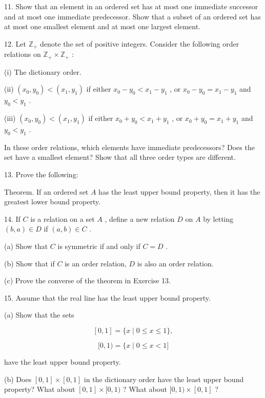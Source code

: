 11. Show that an element in an ordered set has at most one immediate successor and at most one immediate predecessor. Show that a subset of an ordered set has at most one smallest element and at most one largest element.

12. Let \({\mathbb{Z}}_{ + }\) denote the set of positive integers. Consider the following order relations on \({\mathbb{Z}}_{ + } \times  {\mathbb{Z}}_{ + }\) :

(i) The dictionary order.

(ii) \(\left( {{x}_{0},{y}_{0}}\right)  < \left( {{x}_{1},{y}_{1}}\right)\) if either \({x}_{0} - {y}_{0} < {x}_{1} - {y}_{1}\) , or \({x}_{0} - {y}_{0} = {x}_{1} - {y}_{1}\) and \({y}_{0} < {y}_{1}\) .

(iii) \(\left( {{x}_{0},{y}_{0}}\right)  < \left( {{x}_{1},{y}_{1}}\right)\) if either \({x}_{0} + {y}_{0} < {x}_{1} + {y}_{1}\) , or \({x}_{0} + {y}_{0} = {x}_{1} + {y}_{1}\) and \({y}_{0} < {y}_{1}\) .

In these order relations, which elements have immediate predecessors? Does the set have a smallest element? Show that all three order types are different.

13. Prove the following:

Theorem. If an ordered set \(A\) has the least upper bound property, then it has the greatest lower bound property.

14. If \(C\) is a relation on a set \(A\) , define a new relation \(D\) on \(A\) by letting \(\left( {b,a}\right)  \in  D\) if \(\left( {a,b}\right)  \in  C\) .

(a) Show that \(C\) is symmetric if and only if \(C = D\) .

(b) Show that if \(C\) is an order relation, \(D\) is also an order relation.

(c) Prove the converse of the theorem in Exercise 13.

15. Assume that the real line has the least upper bound property.

(a) Show that the sets

\[
\left\lbrack  {0,1}\right\rbrack   = \{ x \mid  0 \leq  x \leq  1\} ,
\]

\[
\lbrack 0,1) = \{ x \mid  0 \leq  x < 1\rbrack
\]

have the least upper bound property.

(b) Does \(\left\lbrack  {0,1}\right\rbrack   \times  \left\lbrack  {0,1}\right\rbrack\) in the dictionary order have the least upper bound property? What about \(\left\lbrack  {0,1}\right\rbrack   \times  \lbrack 0,1)\) ? What about \(\lbrack 0,1) \times  \left\lbrack  {0,1}\right\rbrack\) ?

